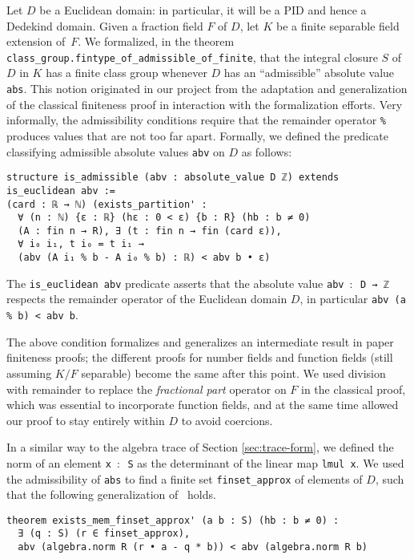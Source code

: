 \documentclass[sn-mathphys]{sn-jnl}%
\newcommand{\lean}[1]{\texttt{#1}\xspace}
\begin{document}
Let $D$ be a Euclidean domain: in particular, it will be a PID and hence a Dedekind domain. Given a fraction field $F$ of $D$, let $K$ be a finite separable field extension of~$F$.
We formalized, in the theorem \lean{class\_group.fintype\_of\_\-admissible\_\-of\_finite}, that the integral closure $S$ of $D$ in $K$ has a finite class group whenever $D$ has an ``admissible'' absolute value \lean{abs}.
This notion originated in our project from the adaptation and generalization of the classical finiteness proof in interaction with the formalization efforts.
Very informally, the admissibility conditions require that the remainder operator \lean{\%} produces values that are not too far apart.
Formally, we defined the predicate classifying admissible absolute values \lean{abv} on $D$ as follows:
\pagebreak[3] %
\begin{lstlisting}
structure is_admissible (abv : absolute_value D ℤ) extends is_euclidean abv :=
(card : ℝ → ℕ) (exists_partition' :
  ∀ (n : ℕ) {ε : ℝ} (hε : 0 < ε) {b : R} (hb : b ≠ 0)
  (A : fin n → R), ∃ (t : fin n → fin (card ε)),
  ∀ i₀ i₁, t i₀ = t i₁ →
  (abv (A i₁ % b - A i₀ % b) : ℝ) < abv b • ε)
\end{lstlisting}
The \lean{is\_euclidean abv} predicate asserts that the absolute value \lean{abv $:$ D → ℤ} respects the remainder operator of the Euclidean domain $D$, in particular \lean{abv (a \% b) < abv b}.

The above condition formalizes and generalizes an intermediate result in paper finiteness proofs;
the different proofs for number fields and function fields (still assuming $K/F$ separable) become the same after this point.
We used division with remainder to replace the \emph{fractional part} operator on $F$ in the classical proof, which was essential to incorporate function fields, and at the same time allowed our proof to stay entirely within $D$ to avoid coercions.

In a similar way to the algebra trace of Section \ref{sec:trace-form}, we defined the norm of an element \lean{x $:$ S} as the determinant of the linear map \lean{lmul x}.
We used the admissibility of \lean{abs} to find a finite set \lean{finset\_approx} of elements of $D$,
such that the following generalization of~\cite[Theorem~12.2.1]{Ireland-Rosen} holds.
\begin{lstlisting}
theorem exists_mem_finset_approx' (a b : S) (hb : b ≠ 0) :
  ∃ (q : S) (r ∈ finset_approx),
  abv (algebra.norm R (r • a - q * b)) < abv (algebra.norm R b)
\end{lstlisting}
\end{document}
